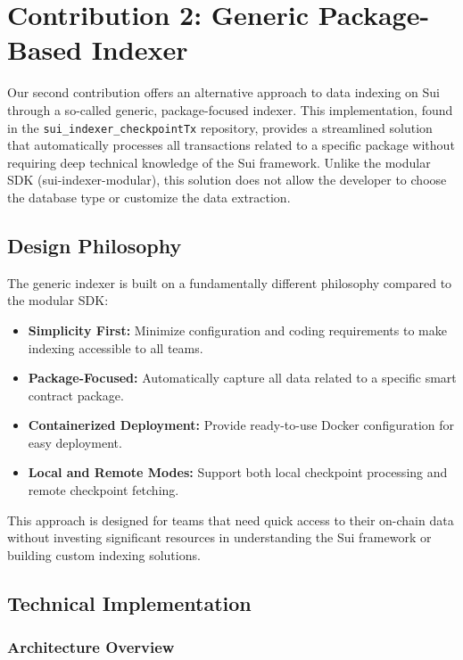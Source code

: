 \section{Contribution 2: Generic Package-Based Indexer}

Our second contribution offers an alternative approach to data indexing on Sui through a so-called generic, package-focused indexer. This implementation, found in the \texttt{sui\_indexer\_checkpointTx} repository, provides a streamlined solution that automatically processes all transactions related to a specific package without requiring deep technical knowledge of the Sui framework. Unlike the modular SDK (sui-indexer-modular), this solution does not allow the developer to choose the database type or customize the data extraction.

\subsection{Design Philosophy}

The generic indexer is built on a fundamentally different philosophy compared to the modular SDK:

\begin{itemize}
    \item \textbf{Simplicity First:} Minimize configuration and coding requirements to make indexing accessible to all teams.
    \item \textbf{Package-Focused:} Automatically capture all data related to a specific smart contract package.
    \item \textbf{Containerized Deployment:} Provide ready-to-use Docker configuration for easy deployment.
    \item \textbf{Local and Remote Modes:} Support both local checkpoint processing and remote checkpoint fetching.
\end{itemize}

This approach is designed for teams that need quick access to their on-chain data without investing significant resources in understanding the Sui framework or building custom indexing solutions.

\subsection{Technical Implementation}

\subsubsection{Architecture Overview}

